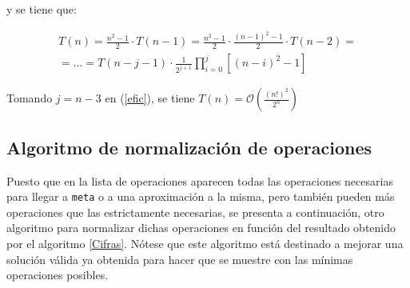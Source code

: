 \documentclass[a4paper,10pt]{scrartcl}
\def\C++#1{\texttt{#1}}
\begin{document}
\begin{itemize}
    y se tiene que:
    
    \begin{eqnarray} \label{efic}
    T(n)=\frac{n^2-1}{2}\cdot T(n-1)= \frac{n^2-1}{2}\cdot\frac{(n-1)^2-1}{2}
    \cdot T(n-2)=\\ \nonumber
    =\ldots=T(n-j-1)\cdot\frac{1}{2^{j+1}}\prod_{i=0}^j[(n-i)^2-1]
    \end{eqnarray}
    
    Tomando $j=n-3$ en (\ref{efic}), se tiene $T(n)=
    \mathcal{O}\left(\frac{(n!)^2}{2^n}\right)$
   \end{itemize}

   \newpage
   
\subsection{Algoritmo de normalización de operaciones}
   Puesto que en la lista de operaciones aparecen todas las operaciones necesarias
   para llegar a \C++{meta} o a una aproximación a la misma, pero también pueden
   más operaciones que las estrictamente necesarias, se presenta a continuación,
   otro algoritmo para normalizar dichas operaciones en función del resultado obtenido
   por el algoritmo \ref{Cifras}. Nótese que este algoritmo está destinado a mejorar una
   solución válida ya obtenida para hacer que se muestre con las mínimas operaciones posibles.\\
   
\end{document}
